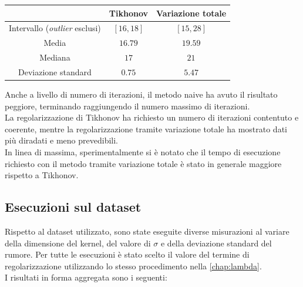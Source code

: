 \documentclass[11pt]{article}
\begin{document}
\begin{center}
    \begin{tabular}{ |c|c|c| }
    \hline
    & Tikhonov & Variazione totale \\ 
    \hline
    Intervallo (\emph{outlier} esclusi) & $[16, 18]$ & $[15, 28]$ \\
    Media & $16.79$ & $19.59$ \\
    Mediana & $17$ & $21$ \\
    Deviazione standard & $0.75$ & $5.47$ \\
    \hline
    \end{tabular}
\end{center}
Anche a livello di numero di iterazioni, il metodo naive ha avuto il risultato peggiore, terminando raggiungendo il numero massimo di iterazioni.\\
La regolarizzazione di Tikhonov ha richiesto un numero di iterazioni contentuto e coerente, mentre la regolarizzazione tramite variazione totale ha mostrato dati più diradati e meno prevedibili.\\
In linea di massima, sperimentalmente si è notato che il tempo di esecuzione richiesto con il metodo tramite variazione totale è stato in generale maggiore rispetto a Tikhonov.

\subsection{Esecuzioni sul dataset}
Rispetto al dataset utilizzato, sono state eseguite diverse misurazioni al variare della dimensione del kernel, del valore di $\sigma$ e della deviazione standard del rumore. 
Per tutte le esecuzioni è stato scelto il valore del termine di regolarizzazione utilizzando lo stesso procedimento nella \autoref{chap:lambda}.\\
I risultati in forma aggregata sono i seguenti:
\end{document}
